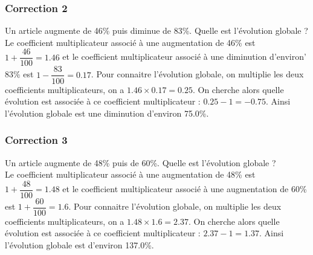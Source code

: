 \documentclass[15pt, mathserif]{beamer}
\begin{document}
\begin{frame}
\vspace{-10mm}
	\frametitle{Correction 2}
\vspace*{1cm} Un article augmente de 46\% puis diminue de 83\%. Quelle est l'évolution globale ? \\ Le coefficient multiplicateur associé à une augmentation de 46\% est $1+\dfrac{46}{100} = 1.46$ et le coefficient multiplicateur associé à une diminution d'environ' 83\% est $1-\dfrac{83}{100} = 0.17$. Pour connaitre l'évolution globale, on multiplie les deux coefficients multiplicateurs, on a $ 1.46 \times 0.17=0.25$. On cherche alors quelle évolution est associée à ce coefficient multiplicateur : $0.25-1 =-0.75$. Ainsi l'évolution globale est une diminution d'environ 75.0\%. 
 \begin{center} 
 \end{center}\end{frame}


\begin{frame}
\vspace{-10mm}
	\frametitle{Correction 3}
\vspace*{1cm} Un article augmente de 48\% puis de 60\%. Quelle est l'évolution globale ? \\ Le coefficient multiplicateur associé à une augmentation de 48\% est $1+\dfrac{48}{100} = 1.48$ et le coefficient multiplicateur associé à une augmentation de 60\% est $1+\dfrac{60}{100} = 1.6$. Pour connaitre l'évolution globale, on multiplie les deux coefficients multiplicateurs, on a $ 1.48 \times 1.6=2.37$. On cherche alors quelle évolution est associée à ce coefficient multiplicateur : $2.37-1 =1.37$. Ainsi l'évolution globale est d'environ 137.0\%. 
 \begin{center} 
 \end{center}\end{frame}
\end{document}
